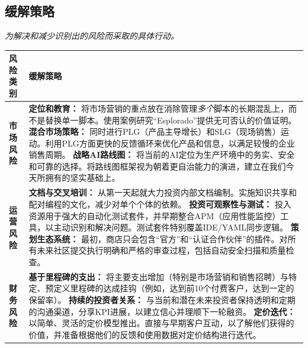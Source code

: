\documentclass[11pt, a4paper, oneside]{article}
\begin{document}
\subsection{缓解策略}
\textit{为解决和减少识别出的风险而采取的具体行动。}

\begin{table}[H]
\centering
\begin{tabularx}{\textwidth}{@{}lL@{}}
\toprule
\textbf{风险类别} & \textbf{缓解策略} \\
\midrule
\textbf{市场风险} & 
\textbf{定位和教育：} 将市场营销的重点放在消除管理\textit{多个}脚本的长期混乱上，而不是替换单一脚本。使用案例研究“Esplorado”提供无可否认的价值证明。 \newline\newline
\textbf{混合市场策略：} 同时进行PLG（产品主导增长）和SLG（现场销售）运动。利用PLG方面更快的反馈循环来优化产品和信息，以满足较慢的企业销售周期。 \newline\newline
\textbf{战略AI路线图：} 将当前的AI定位为生产环境中的务实、安全和可靠的选择。将路线图框架视为朝着更自治能力的演进，建立在我们今天所拥有的坚实基础上。 \\
\addlinespace
\textbf{运营风险} & 
\textbf{文档与交叉培训：} 从第一天起就大力投资内部文档编制。实施知识共享和配对编程的文化，减少对单个个体的依赖。 \newline\newline
\textbf{投资可观察性与测试：} 投入资源用于强大的自动化测试套件，并早期整合APM（应用性能监控）工具，以主动识别和解决问题。测试套件特别覆盖IDE/YAML同步逻辑。 \newline\newline
\textbf{策划生态系统：} 最初，商店只会包含“官方”和“认证合作伙伴”的插件。对所有未来社区提交执行明确和严格的审查过程，包括自动安全扫描和质量检查。 \\
\addlinespace
\textbf{财务风险} & 
\textbf{基于里程碑的支出：} 将主要支出增加（特别是市场营销和销售招聘）与特定、预定义里程碑的达成挂钩（例如，达到前10个付费客户，达到一定的保留率）。 \newline\newline
\textbf{持续的投资者关系：} 与当前和潜在未来投资者保持透明和定期的沟通渠道，分享KPI进展，以建立信心并理顺下一轮融资。 \newline\newline
\textbf{定价迭代：} 以简单、灵活的定价模型推出。直接与早期客户互动，以了解他们获得的价值，并准备根据他们的反馈和使用数据对定价结构进行迭代。 \\
\bottomrule
\end{tabularx}
\end{table}
\end{document}
